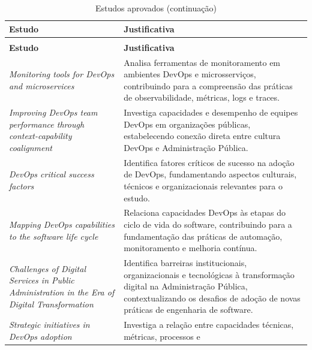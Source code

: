 {\footnotesize
\begin{longtable}{@{}>{\raggedright\arraybackslash}p{4.2cm}
                    p{\dimexpr\linewidth-4.2cm-2\tabcolsep\relax}@{}}
\caption{Estudos aprovados}\label{tab:aprovados}\\
\toprule
\textbf{Estudo} & \textbf{Justificativa} \\
\midrule
\endfirsthead
\caption[]{Estudos aprovados (continuação)}\\
\toprule
\textbf{Estudo} & \textbf{Justificativa} \\
\midrule
\endhead
\bottomrule
\endfoot
\cite{giamattei2024}\newline \emph{Monitoring tools for DevOps and microservices}
  & Analisa ferramentas de monitoramento em ambientes DevOps e microsserviços,
    contribuindo para a compreensão das práticas de observabilidade, métricas,
    logs e traces. \\
\addlinespace
\cite{plant2025}\newline \emph{Improving DevOps team performance through
  context-capability coalignment}
  & Investiga capacidades e desempenho de equipes DevOps em organizações
    públicas, estabelecendo conexão direta entre cultura DevOps e
    Administração Pública. \\
\addlinespace
\cite{azad2023}\newline \emph{DevOps critical success factors}
  & Identifica fatores críticos de sucesso na adoção de DevOps, fundamentando
    aspectos culturais, técnicos e organizacionais relevantes para o
    estudo. \\
\addlinespace
\cite{amaro2025}\newline \emph{Mapping DevOps capabilities to the software
  life cycle}
  & Relaciona capacidades DevOps às etapas do ciclo de vida do software,
    contribuindo para a fundamentação das práticas de automação,
    monitoramento e melhoria contínua. \\
\addlinespace
\cite{figueredo2026}\newline \emph{Challenges of Digital Services in Public
  Administration in the Era of Digital Transformation}
  & Identifica barreiras institucionais, organizacionais e tecnológicas à
    transformação digital na Administração Pública, contextualizando os
    desafios de adoção de novas práticas de engenharia de software. \\
\addlinespace
\cite{amaro2026}\newline \emph{Strategic initiatives in DevOps adoption}
  & Investiga a relação entre capacidades técnicas, métricas, processos e

\end{longtable}}
